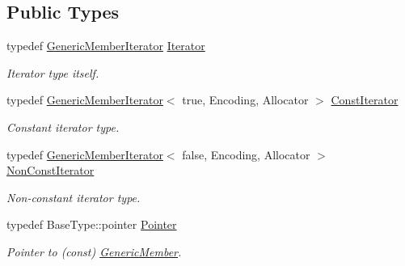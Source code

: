 \subsection*{Public Types}
\begin{DoxyCompactItemize}
\item 
\mbox{\label{classGenericMemberIterator_ad1cf1ecf6210b47906c9f179c893a8b8}} 
typedef \hyperlink{classGenericMemberIterator}{Generic\+Member\+Iterator} \hyperlink{classGenericMemberIterator_ad1cf1ecf6210b47906c9f179c893a8b8}{Iterator}
\begin{DoxyCompactList}\small\item\em Iterator type itself. \end{DoxyCompactList}\item 
\mbox{\label{classGenericMemberIterator_ae5be27a73dce0be58ee2776db896d591}} 
typedef \hyperlink{classGenericMemberIterator}{Generic\+Member\+Iterator}$<$ true, Encoding, Allocator $>$ \hyperlink{classGenericMemberIterator_ae5be27a73dce0be58ee2776db896d591}{Const\+Iterator}
\begin{DoxyCompactList}\small\item\em Constant iterator type. \end{DoxyCompactList}\item 
\mbox{\label{classGenericMemberIterator_abc26eb06f2962765b11dcd06ce84ac02}} 
typedef \hyperlink{classGenericMemberIterator}{Generic\+Member\+Iterator}$<$ false, Encoding, Allocator $>$ \hyperlink{classGenericMemberIterator_abc26eb06f2962765b11dcd06ce84ac02}{Non\+Const\+Iterator}
\begin{DoxyCompactList}\small\item\em Non-\/constant iterator type. \end{DoxyCompactList}\item 
\mbox{\label{classGenericMemberIterator_ac69f141f1fde31c1f550f524a69c5de9}} 
typedef Base\+Type\+::pointer \hyperlink{classGenericMemberIterator_ac69f141f1fde31c1f550f524a69c5de9}{Pointer}
\begin{DoxyCompactList}\small\item\em Pointer to (const) \hyperlink{structGenericMember}{Generic\+Member}. \end{DoxyCompactList}\item 

\end{DoxyCompactItemize}
